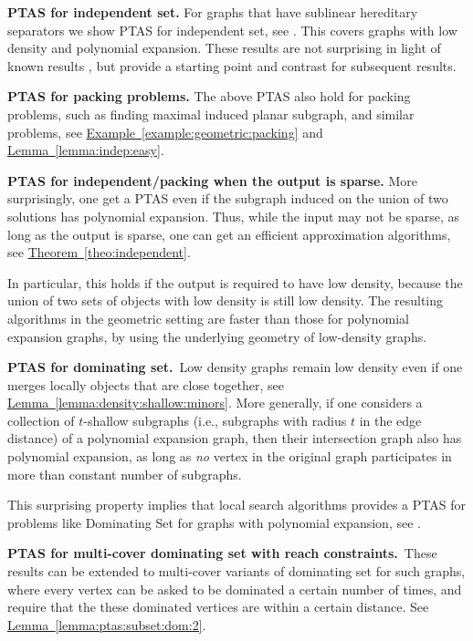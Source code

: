 \documentclass[12pt]{article}
\newlength{\savedparindent}
\newcommand{\SaveIndent}{\setlength{\savedparindent}{\parindent}}
\newcommand{\RestoreIndent}{\setlength{\parindent}{\savedparindent}}
\newcommand{\Term}[1]{\textsf{#1}}
\theoremstyle{remark}\theoremheaderfont{\sf}\theorembodyfont{\upshape}
\numberwithin{figure}{section}\numberwithin{table}{section}\numberwithin{equation}{section}
\newcommand{\HLink}[2]{\hyperref[#2]{#1~\ref*{#2}}}
\newcommand{\exmref}[1]{\HLink{Example}{example:#1}}
\newcommand{\lemref}[1]{\HLink{Lemma}{lemma:#1}}
\newcommand{\thmref}[1]{\HLink{Theorem}{theo:#1}}
\newcommand{\ProblemC}[1]{\textsf{#1}}
\newcommand{\PTAS}{\Term{PTAS}\xspace}
\begin{document}
\smallskip \SaveIndent \begin{compactenum}[(A)]\RestoreIndent \setlength{\itemsep}{3pt}
\item \textbf{\PTAS for independent set.} For graphs that have sublinear hereditary separators we show \PTAS
  for independent set, see . This covers
  graphs with low density and polynomial expansion. These results are
  not surprising in light of known results \cite{ch-aamis-12}, but
  provide a starting point and contrast for subsequent results.

\item \textbf{\PTAS for packing problems.}  The above \PTAS also hold
  for packing problems, such as finding maximal induced planar
  subgraph, and similar problems, see \exmref{geometric:packing} and
  \lemref{indep:easy}.


\item \textbf{\PTAS for independent/packing when the output is
    sparse.} More surprisingly, one get a \PTAS even if the subgraph induced on
  the union of two solutions has polynomial expansion. Thus, while the
  input may not be sparse, as long as the output is sparse, one can
  get an efficient approximation algorithms, see \thmref{independent}.

  In particular, this holds if the output is required to have low
  density, because the union of two sets of objects with low density
  is still low density.  The resulting algorithms in the geometric
  setting are faster than those for polynomial expansion graphs, by
  using the underlying geometry of low-density graphs.


\item \textbf{\PTAS for dominating set.}~Low density graphs remain low density even if one merges locally
  objects that are close together, see
  \lemref{density:shallow:minors}. More generally, if one considers a
  collection of $t$-shallow subgraphs (i.e., subgraphs with radius $t$
  in the edge distance) of a polynomial expansion graph, then their
  intersection graph also has polynomial expansion, as long as
  \emph{no} vertex in the original graph participates in more than
  constant number of subgraphs.

  This surprising property implies that local search algorithms
  provides a \PTAS for problems like \ProblemC{Dominating Set} for
  graphs with polynomial expansion, see .

\item \textbf{\PTAS for multi-cover dominating set with reach
    constraints.}~These results can be extended to multi-cover variants of dominating
  set for such graphs, where every vertex can be asked to be dominated
  a certain number of times, and require that the these dominated
  vertices are within a certain distance.  See
  \lemref{ptas:subset:dom:2}.


\end{compactenum}
\end{document}
